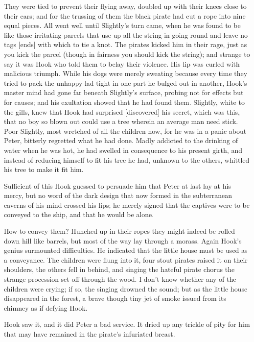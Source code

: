 They were tied to prevent their flying away, doubled up with their knees
close to their ears; and for the trussing of them the black pirate had cut
a rope into nine equal pieces. All went well until Slightly's turn came,
when he was found to be like those irritating parcels that use up all the
string in going round and leave no tags [ends] with which to tie a knot.
The pirates kicked him in their rage, just as you kick the parcel (though
in fairness you should kick the string); and strange to say it was Hook
who told them to belay their violence. His lip was curled with malicious
triumph. While his dogs were merely sweating because every time they tried
to pack the unhappy lad tight in one part he bulged out in another, Hook's
master mind had gone far beneath Slightly's surface, probing not for
effects but for causes; and his exultation showed that he had found them.
Slightly, white to the gills, knew that Hook had surprised [discovered]
his secret, which was this, that no boy so blown out could use a tree
wherein an average man need stick. Poor Slightly, most wretched of all the
children now, for he was in a panic about Peter, bitterly regretted what
he had done. Madly addicted to the drinking of water when he was hot, he
had swelled in consequence to his present girth, and instead of reducing
himself to fit his tree he had, unknown to the others, whittled his tree
to make it fit him.


Sufficient of this Hook guessed to persuade him that Peter at last lay at
his mercy, but no word of the dark design that now formed in the
subterranean caverns of his mind crossed his lips; he merely signed that
the captives were to be conveyed to the ship, and that he would be alone.


How to convey them? Hunched up in their ropes they might indeed be rolled
down hill like barrels, but most of the way lay through a morass. Again
Hook's genius surmounted difficulties. He indicated that the little house
must be used as a conveyance. The children were flung into it, four stout
pirates raised it on their shoulders, the others fell in behind, and
singing the hateful pirate chorus the strange procession set off through
the wood. I don't know whether any of the children were crying; if so, the
singing drowned the sound; but as the little house disappeared in the
forest, a brave though tiny jet of smoke issued from its chimney as if
defying Hook.


Hook saw it, and it did Peter a bad service. It dried up any trickle of
pity for him that may have remained in the pirate's infuriated breast.


